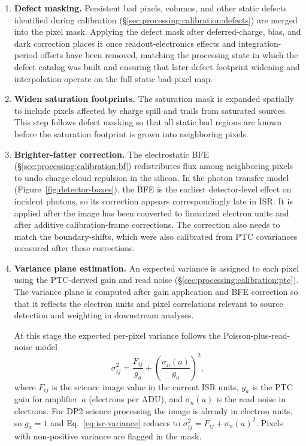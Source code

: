 \begin{enumerate}
    \item \textbf{Defect masking.}
    Persistent bad pixels, columns, and other static defects identified during calibration (\S\ref{sec:processing:calibration:defects}) are merged into the pixel mask.
    Applying the defect mask after deferred-charge, bias, and dark correction places it once readout-electronics effects and integration-period offsets have been removed, matching the processing state in which the defect catalog was built and ensuring that later defect footprint widening and interpolation operate on the full static bad-pixel map.

    \item \textbf{Widen saturation footprints.}
    The saturation mask is expanded spatially to include pixels affected by charge spill and trails from saturated sources.
    This step follows defect masking so that all static bad regions are known before the saturation footprint is grown into neighboring pixels.

    \item \textbf{Brighter-fatter correction.}
    The electrostatic BFE (\S\ref{sec:processing:calibration:bf}) redistributes flux among neighboring pixels to undo charge-cloud repulsion in the silicon.
    In the photon transfer model (Figure~\ref{fig:detector-boxes}), the BFE is the earliest detector-level effect on incident photons, so its correction appears correspondingly late in ISR.
    It is applied after the image has been converted to linearized electron units and after additive calibration-frame corrections.
    The correction also needs to match the boundary-shifts, which were also calibrated from PTC covariances measured after these corrections.

    \item \textbf{Variance plane estimation.}
    An expected variance is assigned to each pixel using the PTC-derived gain and read noise (\S\ref{sec:processing:calibration:ptc}).
    The variance plane is computed after gain application and BFE correction so that it reflects the electron units and pixel correlations relevant to source detection and weighting in downstream analyses.

    At this stage the expected per-pixel variance follows the Poisson-plus-read-noise model
    \begin{equation}
        \sigma^2_{ij} = \frac{F_{ij}}{g_a} + \left(\frac{\sigma_n(a)}{g_a}\right)^2,
        \label{eq:isr-variance}
    \end{equation}
    where $F_{ij}$ is the science image value in the current ISR units, $g_a$ is the PTC gain for amplifier~$a$ (electrons per ADU), and $\sigma_n(a)$ is the read noise in electrons.
    For DP2 science processing the image is already in electron units, so $g_a = 1$ and Eq.~\ref{eq:isr-variance} reduces to $\sigma^2_{ij} = F_{ij} + \sigma_n(a)^2$.
    Pixels with non-positive variance are flagged in the mask.
    

\end{enumerate}
